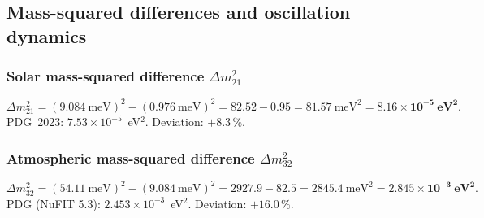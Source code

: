 \subsection{Mass-squared differences and oscillation dynamics}

\subsubsection{Solar mass-squared difference $\Delta m_{21}^2$}

\begin{equation}
  \Delta m_{21}^2 = (9.084~\text{meV})^2 - (0.976~\text{meV})^2
  = 82.52 - 0.95 = 81.57~\text{meV}^2
  = \mathbf{8.16\times10^{-5}~\text{eV}^2}.
\end{equation}
PDG~2023: $7.53\times10^{-5}$~eV$^2$. Deviation: $+8.3\,\%$.

\subsubsection{Atmospheric mass-squared difference $\Delta m_{32}^2$}

\begin{equation}
  \Delta m_{32}^2 = (54.11~\text{meV})^2 - (9.084~\text{meV})^2
  = 2927.9 - 82.5 = 2845.4~\text{meV}^2
  = \mathbf{2.845\times10^{-3}~\text{eV}^2}.
\end{equation}
PDG (NuFIT 5.3): $2.453\times10^{-3}$~eV$^2$. Deviation: $+16.0\,\%$.

